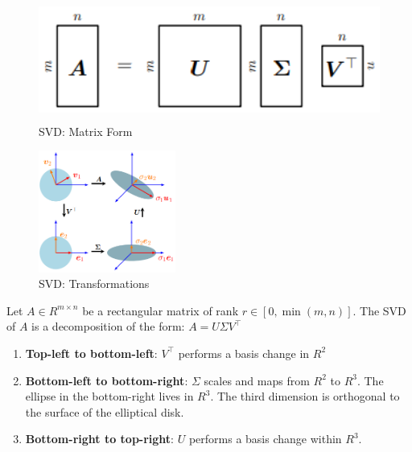 \begin{table}[h]
    \begin{minipage}[b]{0.49\linewidth}
        \begin{figure}[H]
            \centering
            \includegraphics[width=\linewidth, height=4cm, keepaspectratio]{Pictures/maths/svd-1.png}
            \caption{SVD: Matrix Form}
        \end{figure}
    \end{minipage}
    \hfill
    \begin{minipage}[b]{0.49\linewidth}
        \begin{figure}[H]
            \centering
            \includegraphics[width=\linewidth, height=4cm, keepaspectratio]{Pictures/maths/svd-2.png}
            \caption{SVD: Transformations}
        \end{figure}
    \end{minipage}
\end{table}

\begin{theorem}
    Let $A \in R^{m\times n}$ be a rectangular matrix of rank $r \in [0, \min(m, n)]$. The SVD of $A$ is a decomposition of the form: $A = U\Sigma V^\top$
\end{theorem}

\begin{enumerate}
    \item \textbf{Top-left to bottom-left}: $V^\top$ performs a basis change in $R^2$ 

    \item \textbf{Bottom-left to bottom-right}: $\Sigma$ scales and maps from $R^2$ to $R^3$. The ellipse in the bottom-right lives in $R^3$. The third dimension is orthogonal to the surface of the elliptical disk.

    \item \textbf{Bottom-right to top-right}: $U$ performs a basis change within $R^3$.
\end{enumerate}

